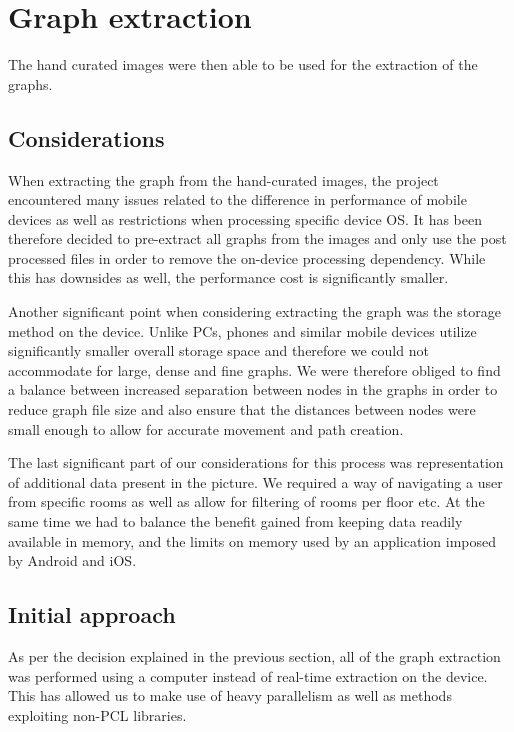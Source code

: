 \documentclass[main.tex]{subfiles}
\begin{document}
\section*{Graph extraction}

The hand curated images were then able to be used for the extraction of the graphs.

\subsection*{Considerations}

When extracting the graph from the hand-curated images, the project encountered many issues related to the difference in performance of mobile devices as well as restrictions when processing specific device OS. It has been therefore decided to pre-extract all graphs from the images and only use the post processed files in order to remove the on-device processing dependency. While this has downsides as well, the performance cost is significantly smaller.
\newline
		
Another significant point when considering extracting the graph was the storage method on the device. Unlike PCs, phones and similar mobile devices utilize significantly smaller overall storage space and therefore we could not accommodate for large, dense and fine graphs. We were therefore obliged to find a balance between increased separation between nodes in the graphs in order to reduce graph file size and also ensure that the distances between nodes were small enough to allow for accurate movement and path creation.
\newline
	
The last significant part of our considerations for this process was representation of additional data present in the picture. We required a way of navigating a user from specific rooms as well as allow for filtering of rooms per floor etc. At the same time we had to balance the benefit gained from keeping data readily available in memory, and the limits on memory used by an application imposed by Android and iOS.

\subsection*{Initial approach}

As per the decision explained in the previous section, all of the graph extraction was performed using a computer instead of real-time extraction on the device. This has allowed us to make use of heavy parallelism as well as methods exploiting non-PCL libraries.
\newline
	
\end{document}
